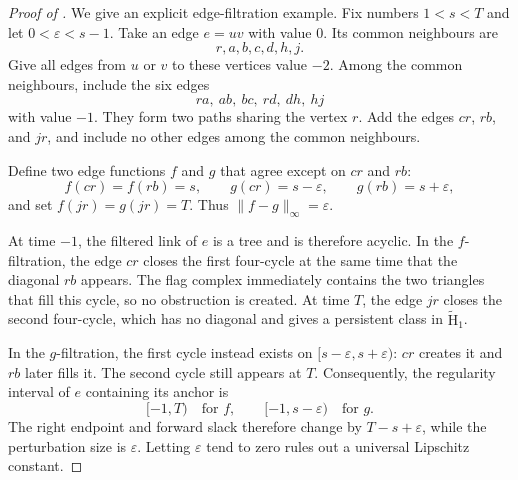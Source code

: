 \documentclass[11pt,letterpaper]{article}
\theoremstyle{definition}
\newcommand{\redH}{\widetilde{\mathrm H}}
\newcommand{\eps}{\varepsilon}
\begin{document}
\begin{proof}[Proof of ]
We give an explicit edge-filtration example. Fix numbers $1<s<T$ and let
$0<\eps<s-1$. Take an edge $e=uv$ with value $0$. Its common neighbours are
$$
r,a,b,c,d,h,j.
$$
Give all edges from $u$ or $v$ to these vertices value $-2$. Among the common
neighbours, include the six edges
$$
ra,\ ab,\ bc,\ rd,\ dh,\ hj
$$
with value $-1$. They form two paths sharing the vertex $r$. Add the edges
$cr$, $rb$, and $jr$, and include no other edges among the common neighbours.

Define two edge functions $f$ and $g$ that agree except on $cr$ and $rb$:
$$
f(cr)=f(rb)=s,
\qquad
g(cr)=s-\eps,
\qquad
g(rb)=s+\eps,
$$
and set $f(jr)=g(jr)=T$. Thus $\|f-g\|_\infty=\eps$.

At time $-1$, the filtered link of $e$ is a tree and is therefore acyclic. In
the $f$-filtration, the edge $cr$ closes the first four-cycle at the same time
that the diagonal $rb$ appears. The flag complex immediately contains the two
triangles that fill this cycle, so no obstruction is created. At time $T$, the
edge $jr$ closes the second four-cycle, which has no diagonal and gives a
persistent class in $\redH_1$.

In the $g$-filtration, the first cycle instead exists on
$[s-\eps,s+\eps)$: $cr$ creates it and $rb$ later fills it. The second cycle
still appears at $T$. Consequently, the regularity interval of $e$ containing
its anchor is
$$
[-1,T)
\quad\text{for }f,
\qquad
[-1,s-\eps)
\quad\text{for }g.
$$
The right endpoint and forward slack therefore change by
$T-s+\eps$, while the perturbation size is $\eps$. Letting $\eps$ tend to
zero rules out a universal Lipschitz constant.
\end{proof}
\end{document}
